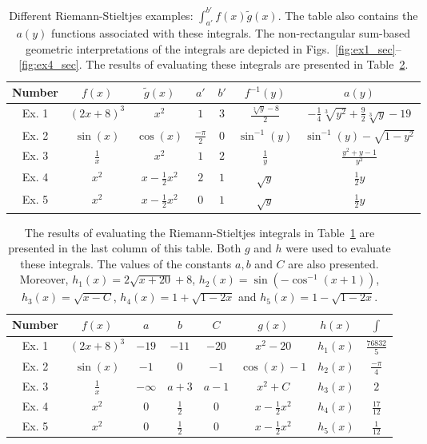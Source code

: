 \documentclass{article}
\theoremstyle{theorem}
\theoremstyle{definition}
\begin{document}
\begin{table}[h!]
\centering
\caption{Different Riemann-Stieltjes examples: $\int_{a'}^{b'}f(x)\widetilde{g}(x)$. The table also contains the $a(y)$ functions 
associated with these integrals. The non-rectangular sum-based geometric interpretations of the integrals are depicted in Figs.~\ref{fig:ex1_sec}--\ref{fig:ex4_sec}.
The results of evaluating these integrals are presented in Table~\ref{tab:table2}.
}
\label{tab:table1}
\begin{tabular}{|c|c|c|c|c||c|c|} 
 Number &$f(x)$ & $\widetilde{g}(x)$&$a'$&$b'$&$f^{-1}(y)$&$a(y)$\\
 \hline
 \hline
 Ex. 1 &$(2x+8)^3$&$x^2$&$1$&$3$&$\frac{\sqrt[3]{y} - 8}{2}$&$-\frac{1}{4}\sqrt[3]{y^2} + \frac{9}{2}\sqrt[3]{y} - 19$\\
 Ex. 2 &$\sin(x)$&$\cos(x)$&$\frac{-\pi}{2}$&$0$&$\sin^{-1}(y)$&$\sin^{-1}(y)-\sqrt{1-y^2}$\\ 
 Ex. 3 &$\frac{1}{x}$&$x^2$&$1$&$2$&$\frac{1}{y}$&$\frac{y^2+y-1}{y^2}$\\
 Ex. 4 &$x^2$&$x-\frac{1}{2}x^2$&$2$&$1$&$\sqrt{y}$&$\frac{1}{2}y$\\
 Ex. 5 &$x^2$&$x-\frac{1}{2}x^2$&$0$&$1$&$\sqrt{y}$&$\frac{1}{2}y$
 \end{tabular}
\end{table}

\begin{table}[h!]
\centering
\caption{The results of evaluating the Riemann-Stieltjes integrals in Table~\ref{tab:table1} are presented in the last column of this table. Both $g$ and $h$ were used to 
evaluate these integrals. The values of the constants $a,b$ and $C$ are also presented. Moreover, $h_1(x) = 2\sqrt{x+20}+8$, $h_2(x)=\sin(-\cos^{-1}(x+1))$, $h_3(x)=\sqrt{x-C}$, $h_4(x)=1+\sqrt{1-2x}$ and
$h_5(x)=1-\sqrt{1-2x}$.}
\label{tab:table2}
\begin{tabular}{|c|c||c|c|c||c|c|c|} 
 Number &$f(x)$&$a$&$b$&$C$&$g(x)$&$h(x)$&$\int$\\
 \hline
 \hline
 Ex. 1 &$(2x+8)^3$&$-19$&$-11$&$-20$&$x^2-20$&$h_1(x)$&$\frac{76832}{5}$\\
 Ex. 2 &$\sin(x)$&$-1$&$0$&$-1$&$\cos(x)-1$&$h_2(x)$&$\frac{-\pi}{4}$\\
 Ex. 3 &$\frac{1}{x}$&$-\infty$&$a+3$&$a-1$&$x^2+C$&$h_3(x)$&$2$\\
 Ex. 4 &$x^2$&$0$&$\frac{1}{2}$&$0$&$x-\frac{1}{2}x^2$&$h_4(x)$&$\frac{17}{12}$\\
 Ex. 5 &$x^2$&$0$&$\frac{1}{2}$&$0$&$x-\frac{1}{2}x^2$&$h_5(x)$&$\frac{1}{12}$\\
 \end{tabular}
\end{table}
\end{document}
